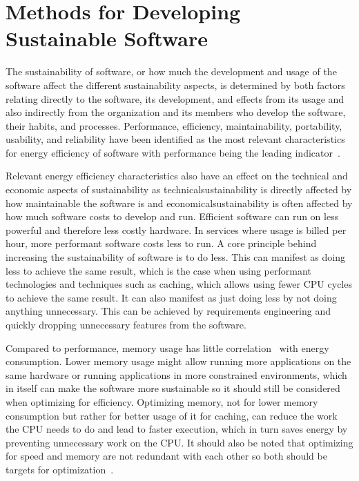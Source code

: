 \section{Methods for Developing Sustainable Software}\label{methods}
The sustainability of software, or how much the development and usage of the software affect the different sustainability aspects, is determined by both factors relating directly to the software, its development, and effects from its usage and also indirectly from the organization and its members who develop the software, their habits, and processes. Performance, efficiency, maintainability, portability, usability, and reliability have been identified as the most relevant characteristics for energy efficiency of software with performance being the leading indicator~\cite{systemicliteraturereview}.

Relevant energy efficiency characteristics also have an effect on the technical and economic aspects of sustainability as \gls{technicalsustainability} is directly affected by how maintainable the software is and \gls{economicalsustainability} is often affected by how much software costs to develop and run. Efficient software can run on less powerful and therefore less costly hardware. In services where usage is billed per hour, more performant software costs less to run. A core principle behind increasing the sustainability of software is to do less. This can manifest as doing less to achieve the same result, which is the case when using performant technologies and techniques such as caching, which allows using fewer CPU cycles to achieve the same result. It can also manifest as just doing less by not doing anything unnecessary. This can be achieved by requirements engineering and quickly dropping unnecessary features from the software.

Compared to performance, memory usage has little correlation~\cite{PEREIRA2021102609}\cite{10.1145/3136014.3136031}\cite{10.1145/3125374.3125382} with energy consumption. Lower memory usage might allow running more applications on the same hardware or running applications in more constrained environments, which in itself can make the software more sustainable so it should still be considered when optimizing for efficiency. Optimizing memory, not for lower memory consumption but rather for better usage of it for caching, can reduce the work the CPU needs to do and lead to faster execution, which in turn saves energy by preventing unnecessary work on the CPU. It should also be noted that optimizing for speed and memory are not redundant with each other so both should be targets for optimization~\cite{studyoninfluenceofsoftware}.

